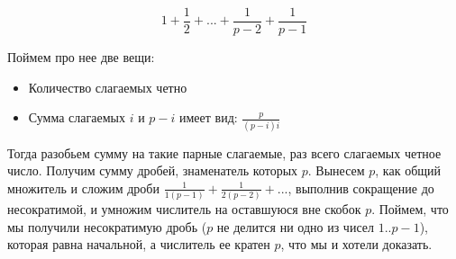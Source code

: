 \documentclass{article}
\begin{document}
	$$ 1 + \frac{1}{2} + ... + \frac{1}{p - 2} + \frac{1}{p - 1} $$
	
	Поймем про нее две вещи:
	\begin{itemize}
		\item Количество слагаемых четно
		
		\item Сумма слагаемых $i$ и $p - i$ имеет вид: $\frac{p}{(p - i)i}$
\end{itemize}	
	Тогда разобьем сумму на такие парные слагаемые, раз всего слагаемых четное число. Получим сумму дробей, знаменатель которых $p$. Вынесем $p$, как общий множитель и сложим дроби $\frac{1}{1(p - 1)} + \frac{1}{2(p - 2)} + ...  $, выполнив сокращение до несократимой, и умножим числитель на оставшуюся вне скобок $p$. Поймем, что мы получили несократимую дробь ($p$ не делится ни одно из чисел $1 .. p-1$), которая равна начальной, а числитель ее кратен $p$, что мы и хотели доказать.
	
	
\end{document}
